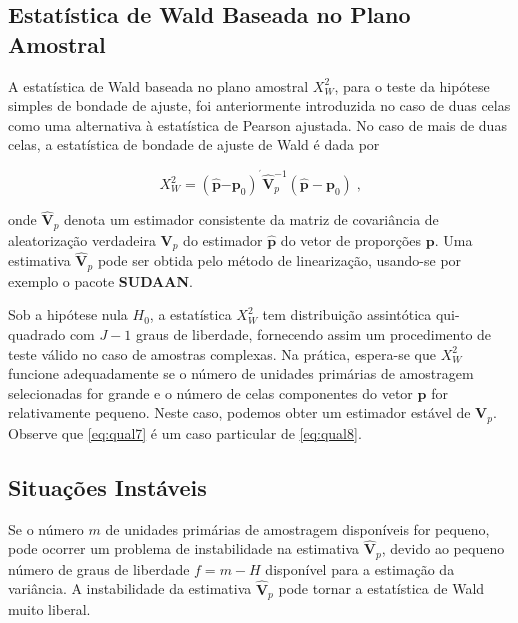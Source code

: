 \documentclass[]{book}
\numberwithin{example}{chapter}
\numberwithin{remark}{chapter}
\numberwithin{definition}{chapter}
\begin{document}
\subsection{Estatística de Wald Baseada no Plano
Amostral}\label{estatistica-de-wald-baseada-no-plano-amostral}

A estatística de Wald baseada no plano amostral \(X_{W}^{2}\), para o
teste da hipótese simples de bondade de ajuste, foi anteriormente
introduzida no caso de duas celas como uma alternativa à estatística de
Pearson ajustada. No caso de mais de duas celas, a estatística de
bondade de ajuste de Wald é dada por

\begin{equation}
X_{W}^{2}=\left( \widehat{\mathbf{p}}\mathbf{-p}_{0}\right) ^{^{\prime }}
\widehat{\mathbf{V}}_{p}^{-1}\left( \widehat{\mathbf{p}}-\mathbf{p}_{0}\right) \;\mbox{,} 
\label{eq:qual8}
\end{equation}

onde \(\widehat{\mathbf{V}}_{p}\) denota um estimador consistente da
matriz de covariância de aleatorização verdadeira \(\mathbf{V}_{p}\) do
estimador \(\widehat{\mathbf{p}}\) do vetor de proporções
\(\mathbf{p}\). Uma estimativa \(\widehat{\mathbf{V}}_{p}\) pode ser
obtida pelo método de linearização, usando-se por exemplo o pacote
\textbf{SUDAAN}.

Sob a hipótese nula \(H_{0}\), a estatística \(X_{W}^{2}\) tem
distribuição assintótica qui-quadrado com \(J-1\) graus de liberdade,
fornecendo assim um procedimento de teste válido no caso de amostras
complexas. Na prática, espera-se que \(X_{W}^{2}\) funcione
adequadamente se o número de unidades primárias de amostragem
selecionadas for grande e o número de celas componentes do vetor
\(\mathbf{p}\) for relativamente pequeno. Neste caso, podemos obter um
estimador estável de \(\mathbf{V}_{p}\). Observe que \eqref{eq:qual7} é um
caso particular de \eqref{eq:qual8}.

\subsection{Situações Instáveis}

Se o número \(m\) de unidades primárias de amostragem disponíveis for
pequeno, pode ocorrer um problema de instabilidade na estimativa
\(\widehat{\mathbf{V}}_{p}\), devido ao pequeno número de graus de
liberdade \(f=m-H\) disponível para a estimação da variância. A
instabilidade da estimativa \(\widehat{\mathbf{V}}_{p}\) pode tornar a
estatística de Wald muito liberal.
\end{document}
